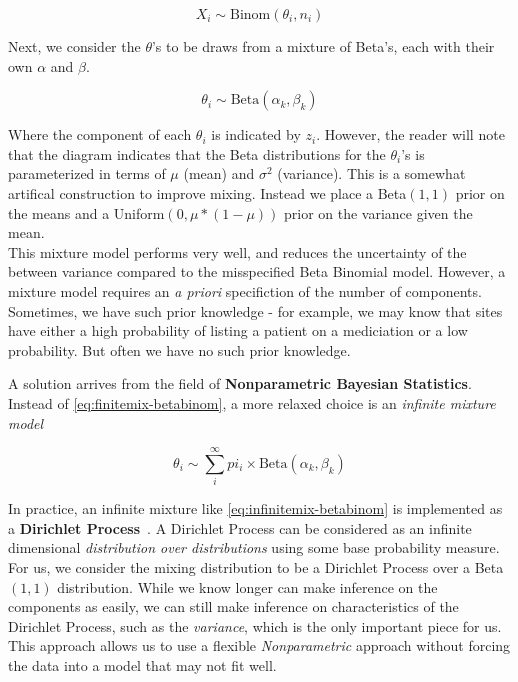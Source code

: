 \documentclass{article}
\begin{document}
\begin{equation}\label{eq:data}
    X_i \sim \text{Binom}(\theta_i, n_i)
\end{equation}

Next, we consider the $\theta$'s to be draws from a mixture of Beta's, each with their own $\alpha$ and $\beta$.

\begin{equation}\label{eq:theta}
    \theta_i \sim \text{Beta}(\alpha_k, \beta_k)
\end{equation}

Where the component of each $\theta_i$ is indicated by $z_i$. However, the reader will note that the diagram indicates that the Beta distributions for the $\theta_i$'s is parameterized in terms of $\mu$ (mean) and $\sigma^2$ (variance). This is a somewhat artifical construction to improve mixing. Instead we place a Beta$(1, 1)$ prior on the means and a Uniform$(0, \mu * (1-\mu))$ prior on the variance given the mean. \\

This mixture model performs very well, and reduces the uncertainty of the between variance compared to the misspecified Beta Binomial model. However, a mixture model requires an \textit{a priori} specifiction of the number of components. Sometimes, we have such prior knowledge - for example, we may know that sites have either a high probability of listing a patient on a mediciation or a low probability. But often we have no such prior knowledge. 

A solution arrives from the field of \textbf{Nonparametric Bayesian Statistics}. Instead of \eqref{eq:finitemix-betabinom}, a more relaxed choice is an \textit{infinite mixture model}

\begin{equation}\label{eq:infinitemix-betabinom}
\theta_i \sim \sum_i^{\infty} pi_i \times \text{Beta}(\alpha_k, \beta_k)
\end{equation}

In practice, an infinite mixture like \eqref{eq:infinitemix-betabinom} is implemented as a \textbf{Dirichlet Process}~\cite{gelman2004}. A Dirichlet Process can be considered as an infinite dimensional \textit{distribution over distributions} using some base probability measure. For us, we consider the mixing distribution to be a Dirichlet Process over a Beta$(1, 1)$ distribution. While we know longer can make inference on the components as easily, we can still make inference on characteristics of the Dirichlet Process, such as the \textit{variance}, which is the only important piece for us. This approach allows us to use a flexible \textit{Nonparametric} approach without forcing the data into a model that may not fit well.
\end{document}

